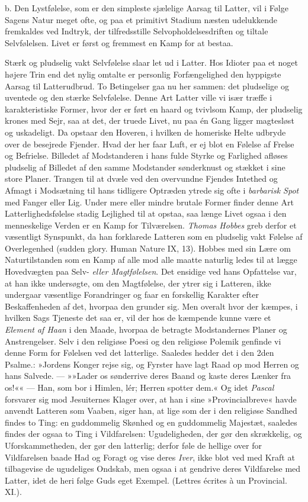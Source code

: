 \documentclass[12pt,a4paper,openany]{book}
\newcommand{\opage}[1]{\marginnote{\footnotesize\textit{[#1]}}}
\begin{document}
b. Den Lystfølelse, som er den simpleste sjælelige Aarsag til Latter,
vil i Følge Sagens Natur meget ofte, og paa et primitivt Stadium næsten
udelukkende fremkaldes ved Indtryk,
\opage{346}der tilfredsstille Selvopholdelsesdriften og tiltale
Selvfølelsen. Livet er først og fremmest en Kamp for at bestaa.

Stærk og pludselig vakt Selvfølelse slaar let ud i Latter. Hos Idioter
paa et noget højere Trin end det nylig omtalte er personlig
Forfængelighed den hyppigste Aarsag til Latterudbrud. To Betingelser gaa
nu her sammen: det pludselige og uventede og den stærke Selvfølelse.
Denne Art Latter ville vi især træffe i karakteristiske Former, hvor der
er ført en haard og tvivlsom Kamp, der pludselig krones med Sejr, saa at
det, der truede Livet, nu paa én Gang ligger magtesløst og uskadeligt.
Da opstaar den Hoveren, i hvilken de homeriske Helte udbryde over de
besejrede Fjender. Hvad der her faar Luft, er ej blot en Følelse af
Frelse og Befrielse. Billedet af Modstanderen i hans fulde Styrke og
Farlighed afløses pludselig af Billedet af den samme Modstander
sønderknust og stækket i sine store Planer. Trangen til at dvæle ved den
overvundne Fjendes Intethed og Afmagt i Modsætning til hans tidligere
Optræden ytrede sig ofte i \emph{barbarisk Spot} med Fanger eller Lig.
Under mere eller mindre brutale Former finder denne Art
Latterlighedsfølelse stadig Lejlighed til at opstaa, saa længe Livet
ogsaa i den menneskelige Verden er en Kamp for Tilværelsen. \emph{Thomas
Hobbes} greb derfor et væsentligt Synspunkt, da han forklarede Latteren
som en pludselig vakt Følelse af Overlegenhed (sudden glory. Human
Nature IX, 13). Hobbes med sin Lære om Naturtilstanden som en Kamp af
alle mod alle maatte naturlig ledes til at lægge Hovedvægten paa Selv-
\emph{eller Magtfølelsen}. Det ensidige ved hans Opfattelse var, at han
ikke undersøgte, om den Magtfølelse, der ytrer sig i Latteren, ikke
undergaar væsentlige Forandringer og faar en forskellig Karakter efter
Beskaffenheden af det, hvorpaa den grunder sig. Men overalt hvor der
kæmpes, i hvilken Sags Tjeneste det saa er, vil der hos de kæmpende
kunne være et \emph{Element af Haan} i den Maade, hvorpaa de betragte
Modstandernes Planer og Anstrengelser. Selv i den religiøse Poesi og den
religiøse Polemik genfinde vi denne Form for Følelsen ved det
latterlige. Saaledes hedder det i den 2den Psalme.: »Jordens Konger
rejse sig, og Fyrster have lagt Raad op mod Herren og hans Salvede. ---
»»Lader os sønderrive deres Baand og kaste deres
\opage{347}Lænker fra os!«« --- Han, som bor i Himlen, lér; Herren
spotter dem.« Og idet \emph{Pascal} forsvarer sig mod Jesuiternes Klager
over, at han i sine »Provincialbreve« havde anvendt Latteren som Vaaben,
siger han, at lige som der i den religiøse Sandhed findes to Ting: en
guddommelig Skønhed og en guddommelig Majestæt, saaledes findes der
ogsaa to Ting i Vildfarelsen: Ugudeligheden, der gør den skrækkelig, og
Uforskammetheden, der gør den latterlig; derfor føle de hellige over for
Vildfarelsen baade Had og Foragt og vise deres \emph{Iver}, ikke blot
ved med Kraft at tilbagevise de ugudeliges Ondskab, men ogsaa i at
gendrive deres Vildfarelse med Latter, idet de heri følge Guds eget
Exempel. (Lettres écrites à un Provincial. XI.).
\end{document}

